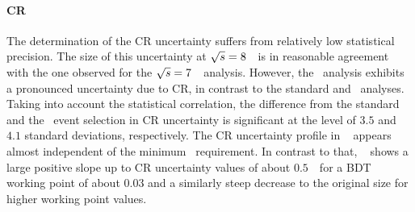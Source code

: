 \paragraph{\gls{CR}}\mbox{}
The determination of the \gls{CR} uncertainty suffers from relatively low statistical precision. The size of this uncertainty at ${\sqrt{s}}=8$~\TeV\ is in reasonable agreement with the one observed for the ${\sqrt{s}}=7$~\TeV\ analysis. However, the \mvabased\ analysis exhibits a pronounced uncertainty due to \gls{CR}, in contrast to the standard and \cutbased\ analyses. Taking into account the statistical correlation, the difference from the standard and the \cutbased\ event selection in \gls{CR} uncertainty is significant at the level of $3.5$ and $4.1$ standard deviations, respectively.
%
The \gls{CR} uncertainty profile in \fig~ appears almost independent of the minimum \ptlb\ requirement.
%
In contrast to that, \fig~ shows a large positive slope up to \gls{CR} uncertainty values of about $0.5$~\GeV\ for a \gls{BDT} working point of about 0.03 and a similarly steep decrease to the original size for higher working point values. 
%
%
